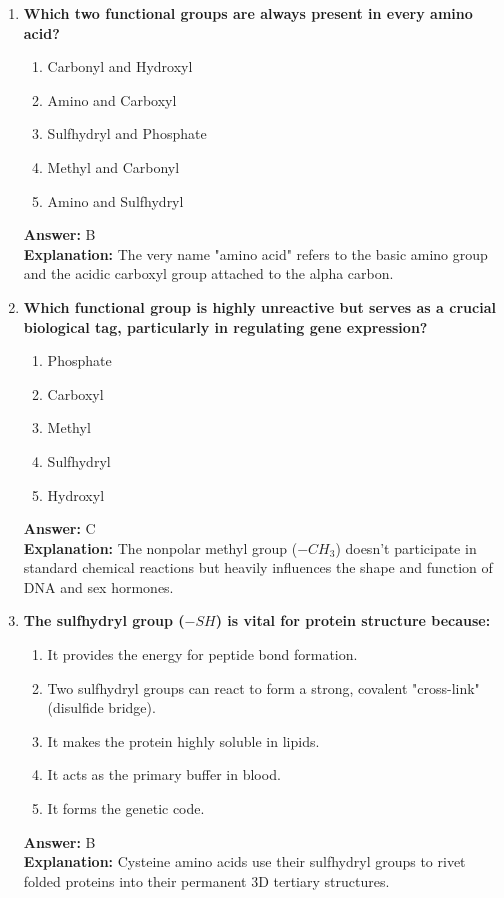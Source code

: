 \documentclass[11pt, a4paper]{article}
\begin{document}
\begin{enumerate}
\item \textbf{Which two functional groups are always present in every amino acid?}
\begin{enumerate}[label=\Alph*.]
    \item Carbonyl and Hydroxyl
    \item Amino and Carboxyl
    \item Sulfhydryl and Phosphate
    \item Methyl and Carbonyl
    \item Amino and Sulfhydryl
\end{enumerate}
\textbf{Answer:} B \\
\textbf{Explanation:} The very name "amino acid" refers to the basic amino group and the acidic carboxyl group attached to the alpha carbon.

\item \textbf{Which functional group is highly unreactive but serves as a crucial biological tag, particularly in regulating gene expression?}
\begin{enumerate}[label=\Alph*.]
    \item Phosphate
    \item Carboxyl
    \item Methyl
    \item Sulfhydryl
    \item Hydroxyl
\end{enumerate}
\textbf{Answer:} C \\
\textbf{Explanation:} The nonpolar methyl group ($-CH_3$) doesn't participate in standard chemical reactions but heavily influences the shape and function of DNA and sex hormones.

\item \textbf{The sulfhydryl group ($-SH$) is vital for protein structure because:}
\begin{enumerate}[label=\Alph*.]
    \item It provides the energy for peptide bond formation.
    \item Two sulfhydryl groups can react to form a strong, covalent "cross-link" (disulfide bridge).
    \item It makes the protein highly soluble in lipids.
    \item It acts as the primary buffer in blood.
    \item It forms the genetic code.
\end{enumerate}
\textbf{Answer:} B \\
\textbf{Explanation:} Cysteine amino acids use their sulfhydryl groups to rivet folded proteins into their permanent 3D tertiary structures.


\end{enumerate}
\end{document}
